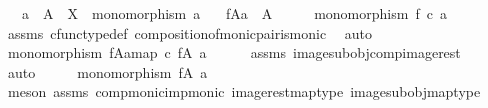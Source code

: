 \begin{isabellebody}
\ \ \ {\isachardoublequoteopen}a\ {\isacharcolon}{\kern0pt}\ A\ {\isasymrightarrow}\ X{\isachardoublequoteclose}\ \ {\isachardoublequoteopen}monomorphism\ a{\isachardoublequoteclose}\isanewline
\ \ \ {\isachardoublequoteopen}f{\isasymlparr}A{\isasymrparr}\isactrlbsub a\isactrlesub \ {\isasymcong}\ A{\isachardoublequoteclose}\isanewline
%
\isadelimproof
%
\endisadelimproof
%
\isatagproof
{}\isamarkupfalse%
\ {\isacharminus}{\kern0pt}\isanewline
\ \ \isamarkupfalse%
\ {\isachardoublequoteopen}monomorphism\ {\isacharparenleft}{\kern0pt}f\ {\isasymcirc}\isactrlsub c\ a{\isacharparenright}{\kern0pt}{\isachardoublequoteclose}\isanewline
\ \ \ \ \isamarkupfalse%
\ assms\ cfunc{\isacharunderscore}{\kern0pt}type{\isacharunderscore}{\kern0pt}def\ composition{\isacharunderscore}{\kern0pt}of{\isacharunderscore}{\kern0pt}monic{\isacharunderscore}{\kern0pt}pair{\isacharunderscore}{\kern0pt}is{\isacharunderscore}{\kern0pt}monic\ \isamarkupfalse%
\ auto\isanewline
\ \ \isamarkupfalse%
\ \isamarkupfalse%
\ {\isachardoublequoteopen}monomorphism\ {\isacharparenleft}{\kern0pt}{\isacharbrackleft}{\kern0pt}f{\isasymlparr}A{\isasymrparr}\isactrlbsub a\isactrlesub {\isacharbrackright}{\kern0pt}map\ {\isasymcirc}\isactrlsub c\ {\isacharparenleft}{\kern0pt}f{\isasymrestriction}\isactrlbsub {\isacharparenleft}{\kern0pt}A{\isacharcomma}{\kern0pt}\ a{\isacharparenright}{\kern0pt}\isactrlesub {\isacharparenright}{\kern0pt}{\isacharparenright}{\kern0pt}{\isachardoublequoteclose}\isanewline
\ \ \ \ \isamarkupfalse%
\ assms\ image{\isacharunderscore}{\kern0pt}subobj{\isacharunderscore}{\kern0pt}comp{\isacharunderscore}{\kern0pt}image{\isacharunderscore}{\kern0pt}rest\ \isamarkupfalse%
\ auto\isanewline
\ \ \isamarkupfalse%
\ \isamarkupfalse%
\ {\isachardoublequoteopen}monomorphism\ {\isacharparenleft}{\kern0pt}f{\isasymrestriction}\isactrlbsub {\isacharparenleft}{\kern0pt}A{\isacharcomma}{\kern0pt}\ a{\isacharparenright}{\kern0pt}\isactrlesub {\isacharparenright}{\kern0pt}{\isachardoublequoteclose}\isanewline
\ \ \ \ \isamarkupfalse%
\ {\isacharparenleft}{\kern0pt}meson\ assms\ comp{\isacharunderscore}{\kern0pt}monic{\isacharunderscore}{\kern0pt}imp{\isacharunderscore}{\kern0pt}monic{\isacharprime}{\kern0pt}\ image{\isacharunderscore}{\kern0pt}rest{\isacharunderscore}{\kern0pt}map{\isacharunderscore}{\kern0pt}type\ image{\isacharunderscore}{\kern0pt}subobj{\isacharunderscore}{\kern0pt}map{\isacharunderscore}{\kern0pt}type{\isacharparenright}{\kern0pt}\isanewline

\end{isabellebody}
